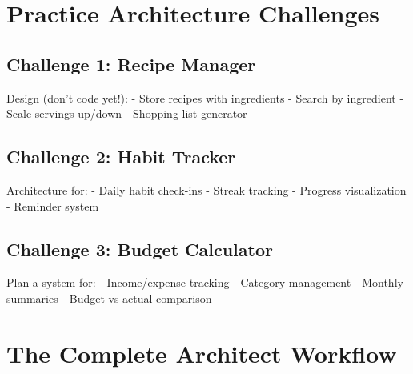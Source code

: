 \documentclass[
  letterpaper,
  DIV=11,
  numbers=noendperiod,
  oneside]{scrreprt}
\begin{document}
\section{Practice Architecture
Challenges}\label{practice-architecture-challenges}

\subsection{Challenge 1: Recipe
Manager}\label{challenge-1-recipe-manager}

Design (don't code yet!): - Store recipes with ingredients - Search by
ingredient - Scale servings up/down - Shopping list generator

\subsection{Challenge 2: Habit Tracker}\label{challenge-2-habit-tracker}

Architecture for: - Daily habit check-ins - Streak tracking - Progress
visualization - Reminder system

\subsection{Challenge 3: Budget
Calculator}\label{challenge-3-budget-calculator}

Plan a system for: - Income/expense tracking - Category management -
Monthly summaries - Budget vs actual comparison

\section{The Complete Architect
Workflow}\label{the-complete-architect-workflow}
\end{document}

